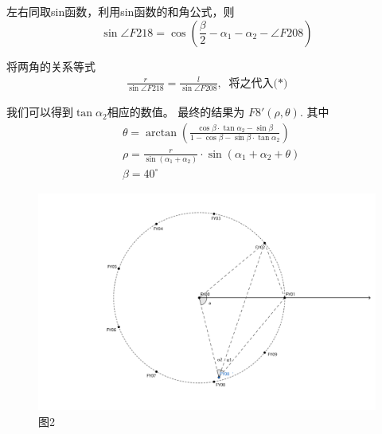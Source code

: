 \documentclass{ctexart}
\def\al{\alpha}
\def\b{\beta}
\def\t{\theta}
\def\c{\circ}
\begin{document}
	左右同取sin函数，利用sin函数的和角公式，则
	\begin{equation}
		\sin \angle F218 = \cos(\frac{\b}{2}-\al_1-\al_2- \angle F208)\tag{*}
	\end{equation}

	将两角的关系等式
	\begin{align*}
		\frac{r}{\sin \angle F2 1 8}=\frac{l}{\sin \angle F208},\;\;\mbox{将之代入(*)}
	\end{align*}

	我们可以得到$\tan\al_2$相应的数值。
	最终的结果为 $F8'( \rho, \theta )$.
	其中
	\begin{equation}
		\begin{aligned}
			&\t=\arctan( \frac{\cos\b \cdot \tan\al_2-\sin\b}{1-\cos\b-\sin\b \cdot \tan\al_2}  )\\
			&\rho=\frac{r}{\sin(\alpha_1 + \alpha_2)}\cdot \sin(\alpha_1+\alpha_2+\theta)\\
			&\b=40^\c
		\end{aligned}
	\end{equation}


	\begin{figure}[htbp]  %
		\centering
		\includegraphics[scale=0.6]{pic/2.png}
		\caption*{图2}
		\label{fig2}
	\end{figure}
\end{document}
